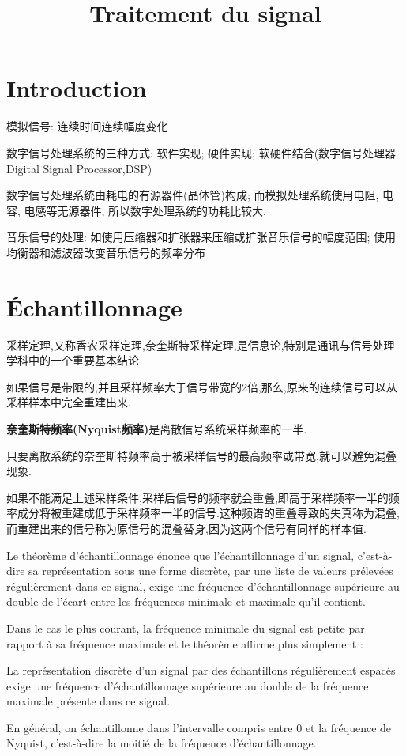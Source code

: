 \documentclass{article}
\begin{document}
\title{Traitement du signal}
\maketitle
\tableofcontents
\newpage

\section{Introduction}
模拟信号: 连续时间连续幅度变化

数字信号处理系统的三种方式: 软件实现; 硬件实现; 软硬件结合(数字信号处理器Digital Signal Processor,DSP)

数字信号处理系统由耗电的有源器件(晶体管)构成; 而模拟处理系统使用电阻, 电容, 电感等无源器件, 所以数字处理系统的功耗比较大.

音乐信号的处理:  
如使用压缩器和扩张器来压缩或扩张音乐信号的幅度范围;
使用均衡器和滤波器改变音乐信号的频率分布

\section{\'Echantillonnage}
采样定理,又称香农采样定理,奈奎斯特采样定理,是信息论,特别是通讯与信号处理学科中的一个重要基本结论

如果信号是带限的,并且采样频率大于信号带宽的2倍,那么,原来的连续信号可以从采样样本中完全重建出来.

\textbf{奈奎斯特频率(Nyquist频率)}是离散信号系统采样频率的一半.

只要离散系统的奈奎斯特频率高于被采样信号的最高频率或带宽,就可以避免混叠现象.

如果不能满足上述采样条件,采样后信号的频率就会重叠,即高于采样频率一半的频率成分将被重建成低于采样频率一半的信号.这种频谱的重叠导致的失真称为混叠,而重建出来的信号称为原信号的混叠替身,因为这两个信号有同样的样本值.

Le théorème d'échantillonnage énonce que l'échantillonnage d'un signal, c'est-à-dire sa représentation sous une forme discrète, par une liste de valeurs prélevées régulièrement dans ce signal, exige une fréquence d'échantillonnage supérieure au double de l'écart entre les fréquences minimale et maximale qu'il contient.

Dans le cas le plus courant, la fréquence minimale du signal est petite par rapport à sa fréquence maximale et le théorème affirme plus simplement :

La représentation discrète d'un signal par des échantillons régulièrement espacés exige une fréquence d'échantillonnage supérieure au double de la fréquence maximale présente dans ce signal.

En général, on échantillonne dans l'intervalle compris entre 0 et la fréquence de Nyquist, c'est-à-dire la moitié de la fréquence d'échantillonnage.
\end{document}

